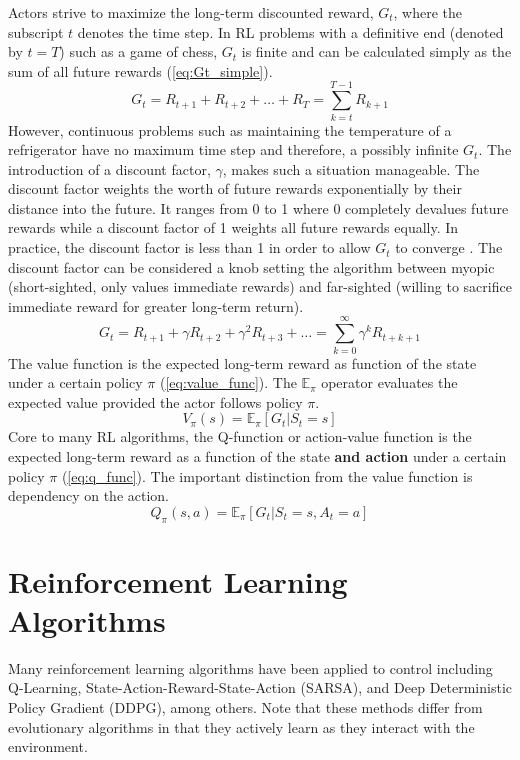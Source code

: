 Actors strive to maximize the long-term discounted reward, $G_t$, where the subscript $t$ denotes the time step. In RL problems with a definitive end (denoted by $t=T$) such as a game of chess, $G_t$ is finite and can be calculated simply as the sum of all future rewards (\ref{eq:Gt_simple}). 
\begin{equation}
	\label{eq:Gt_simple}
	G_t=R_{t+1}+R_{t+2}+\dots + R_{T}=\sum_{k=t}^{T-1} R_{k+1}
\end{equation}
However, continuous problems such as maintaining the temperature of a refrigerator have no maximum time step and therefore, a possibly infinite $G_t$. The introduction of a discount factor, $\gamma$, makes such a situation manageable. The discount factor weights the worth of future rewards exponentially by their distance into the future. It ranges from 0 to 1 where 0 completely devalues future rewards while a discount factor of 1 weights all future rewards equally. In practice, the discount factor is less than 1 in order to allow $G_t$ to converge \cite{sutton_2017}. The discount factor can be considered a knob setting the algorithm between myopic (short-sighted, only values immediate rewards) and far-sighted (willing to sacrifice immediate reward for greater long-term return).
\begin{equation}
	G_t=R_{t+1}+\gamma R_{t+2}+\gamma^2 R_{t+3} + \dots = \sum_{k=0}^{\infty} \gamma^k R_{t+k+1}
\end{equation}
The value function is the expected long-term reward as function of the state under a certain policy $\pi$ (\ref{eq:value_func}). The $\mathbb{E}_\pi$ operator evaluates the expected value provided the actor follows policy $\pi$.
\begin{equation}
	\label{eq:value_func}
	V_\pi(s)=\mathbb{E}_\pi [G_t | S_t =s]
\end{equation}
Core to many RL algorithms, the Q-function or action-value function is the expected long-term reward as a function of the state \textbf{and action} under a certain policy $\pi$ (\ref{eq:q_func}). The important distinction from the value function is dependency on the action. 
\begin{equation}
	\label{eq:q_func}
	Q_\pi(s,a)=\mathbb{E}_\pi [G_t | S_t =s, A_t=a]
\end{equation}


\section{Reinforcement Learning Algorithms}
Many reinforcement learning algorithms have been applied to control including Q-Learning, State-Action-Reward-State-Action (SARSA), and Deep Deterministic Policy Gradient (DDPG), among others. Note that these methods differ from evolutionary algorithms in that they actively learn as they interact with the environment.


